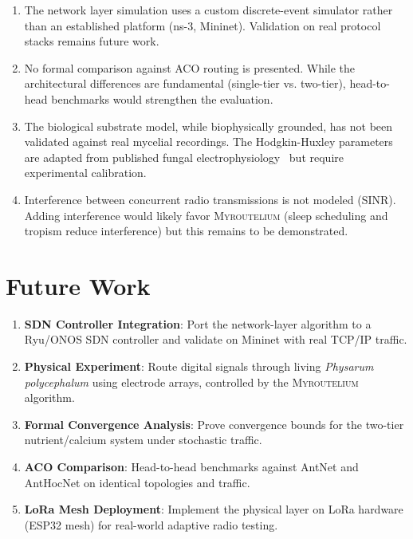 \documentclass[conference,10pt]{IEEEtran}
\newcommand{\myc}{\textsc{Myroutelium}}
\begin{document}
\begin{enumerate}
    \item The network layer simulation uses a custom discrete-event simulator rather than an established platform (ns-3, Mininet). Validation on real protocol stacks remains future work.
    \item No formal comparison against ACO routing is presented. While the architectural differences are fundamental (single-tier vs. two-tier), head-to-head benchmarks would strengthen the evaluation.
    \item The biological substrate model, while biophysically grounded, has not been validated against real mycelial recordings. The Hodgkin-Huxley parameters are adapted from published fungal electrophysiology~\cite{adamatzky2018} but require experimental calibration.
    \item Interference between concurrent radio transmissions is not modeled (SINR). Adding interference would likely favor \myc{} (sleep scheduling and tropism reduce interference) but this remains to be demonstrated.
\end{enumerate}

\section{Future Work}
\label{sec:future}

\begin{enumerate}
    \item \textbf{SDN Controller Integration}: Port the network-layer algorithm to a Ryu/ONOS SDN controller and validate on Mininet with real TCP/IP traffic.
    \item \textbf{Physical Experiment}: Route digital signals through living \emph{Physarum polycephalum} using electrode arrays, controlled by the \myc{} algorithm.
    \item \textbf{Formal Convergence Analysis}: Prove convergence bounds for the two-tier nutrient/calcium system under stochastic traffic.
    \item \textbf{ACO Comparison}: Head-to-head benchmarks against AntNet and AntHocNet on identical topologies and traffic.
    \item \textbf{LoRa Mesh Deployment}: Implement the physical layer on LoRa hardware (ESP32 mesh) for real-world adaptive radio testing.
\end{enumerate}

\end{document}
